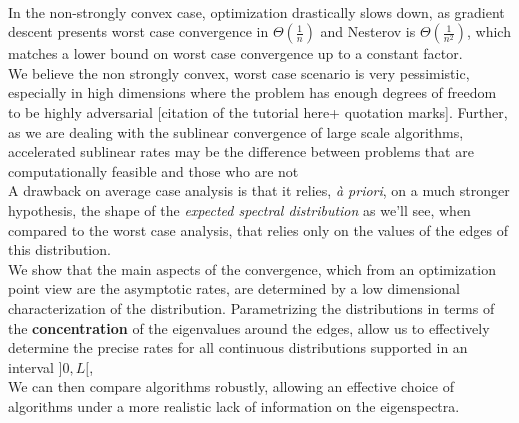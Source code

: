 \documentclass{article}
\begin{document}

\paragraph{}
In the non-strongly convex case, optimization drastically slows down, as gradient descent presents worst case convergence in $\Theta(\frac{1}{n})$ and Nesterov is $\Theta(\frac{1}{n^2})$, which matches a lower bound on worst case convergence up to a constant factor. \\
We believe the non strongly convex, worst case scenario is very pessimistic, especially in high dimensions where the problem has enough degrees of freedom to be highly adversarial [citation of the tutorial here+ quotation marks]. Further, as we are dealing with the sublinear convergence of large scale algorithms,  accelerated sublinear rates may be the difference between problems that are computationally feasible and those who are not  \\
A drawback on average case analysis is that it relies, \textit{à priori}, on a much stronger hypothesis, the shape of the \textit{expected spectral distribution} as we'll see, when compared to the worst case analysis, that relies only on the values of the edges of this distribution. \\
We show that the main aspects of the convergence, which from an optimization point view are the asymptotic rates, are determined by a low dimensional characterization of the distribution. Parametrizing the distributions in terms of the \textbf{concentration} of the eigenvalues around the edges, allow us to effectively determine the precise rates for all continuous distributions supported in an interval $]0,L[$, \\
We can then compare algorithms robustly, allowing an effective choice of algorithms under a more realistic lack of information on the eigenspectra. \\
\end{document}
